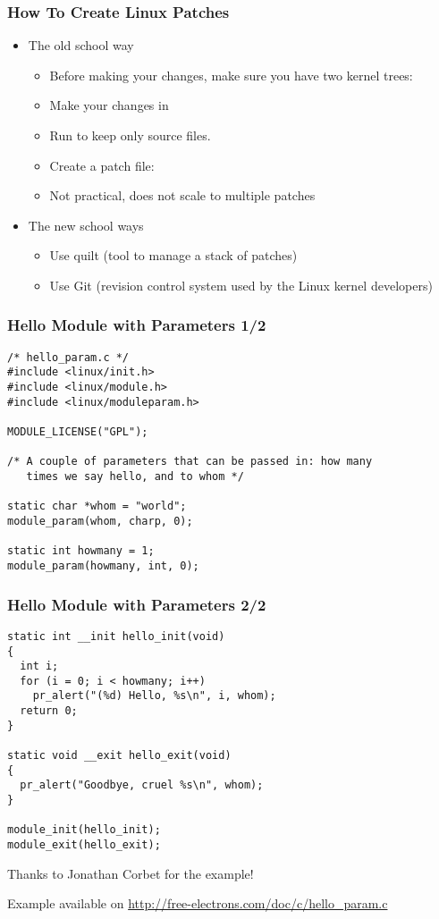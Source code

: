 \begin{frame}
  \frametitle{How To Create Linux Patches}
  \begin{itemize}
  \item The old school way
    \begin{itemize}
    \item Before making your changes, make sure you have two kernel
      trees: 
    \item Make your changes in 
    \item Run  to keep only source files.
    \item Create a patch file:
    \item Not practical, does not scale to multiple patches
    \end{itemize}
  \item The new school ways
    \begin{itemize}
    \item Use quilt (tool to manage a stack of patches)
    \item Use Git (revision control system used by the Linux kernel
      developers)
    \end{itemize}
  \end{itemize}
\end{frame}

\begin{frame}[fragile]
  \frametitle{Hello Module with Parameters 1/2}
\begin{verbatim}
/* hello_param.c */
#include <linux/init.h>
#include <linux/module.h>
#include <linux/moduleparam.h>

MODULE_LICENSE("GPL");

/* A couple of parameters that can be passed in: how many
   times we say hello, and to whom */

static char *whom = "world";
module_param(whom, charp, 0);

static int howmany = 1;
module_param(howmany, int, 0);

\end{verbatim}
\end{frame}

\begin{frame}[fragile]
  \frametitle{Hello Module with Parameters 2/2}
\begin{verbatim}
static int __init hello_init(void)
{
  int i;
  for (i = 0; i < howmany; i++)
    pr_alert("(%d) Hello, %s\n", i, whom);
  return 0;
}

static void __exit hello_exit(void)
{
  pr_alert("Goodbye, cruel %s\n", whom);
}

module_init(hello_init);
module_exit(hello_exit);
\end{verbatim}
Thanks to Jonathan Corbet for the example!

Example available on \url{http://free-electrons.com/doc/c/hello_param.c}
\end{frame}

